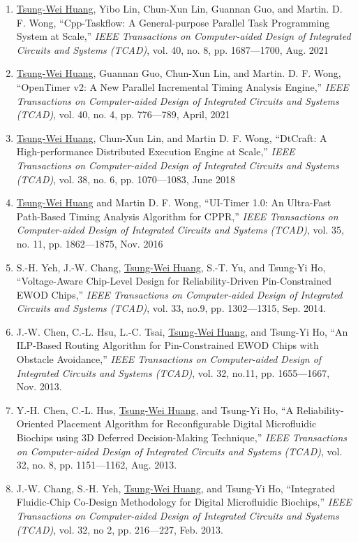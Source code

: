 \documentclass[A4,11pt]{article}
\begin{document}
\begin{enumerate}
  \item \underline{Tsung-Wei Huang}, Yibo Lin, Chun-Xun Lin, Guannan Guo, and Martin. D. F. Wong, ``Cpp-Taskflow: A General-purpose Parallel Task Programming System at Scale,'' \textit{IEEE Transactions on Computer-aided Design of Integrated Circuits and Systems (TCAD)}, vol. 40, no. 8, pp. 1687—1700, Aug. 2021
  \item \underline{Tsung-Wei Huang}, Guannan Guo, Chun-Xun Lin, and Martin. D. F. Wong, ``OpenTimer v2: A New Parallel Incremental Timing Analysis Engine,'' \textit{IEEE Transactions on Computer-aided Design of Integrated Circuits and Systems (TCAD)}, vol. 40, no. 4, pp. 776—789, April, 2021
  \item \underline{Tsung-Wei Huang}, Chun-Xun Lin, and Martin D. F. Wong, ``DtCraft: A High-performance Distributed Execution Engine at Scale,'' \textit{IEEE Transactions on Computer-aided Design of Integrated Circuits and Systems (TCAD)}, vol. 38, no. 6, pp. 1070—1083, June 2018
  \item \underline{Tsung-Wei Huang} and Martin D. F. Wong, ``UI-Timer 1.0: An Ultra-Fast Path-Based Timing Analysis Algorithm for CPPR,'' \textit{IEEE Transactions on Computer-aided Design of Integrated Circuits and Systems (TCAD)}, vol. 35, no. 11, pp. 1862—1875, Nov. 2016
  \item S.-H. Yeh, J.-W. Chang, \underline{Tsung-Wei Huang}, S.-T. Yu, and Tsung-Yi Ho, ``Voltage-Aware Chip-Level Design for Reliability-Driven Pin-Constrained EWOD Chips,'' \textit{IEEE Transactions on Computer-aided Design of Integrated Circuits and Systems (TCAD)}, vol. 33, no.9, pp. 1302—1315, Sep. 2014. 
  \item J.-W. Chen, C.-L. Hsu, L.-C. Tsai, \underline{Tsung-Wei Huang}, and Tsung-Yi Ho, ``An ILP-Based Routing Algorithm for Pin-Constrained EWOD Chips with Obstacle Avoidance,'' \textit{IEEE Transactions on Computer-aided Design of Integrated Circuits and Systems (TCAD)}, vol. 32, no.11, pp. 1655—1667, Nov. 2013.
  \item Y.-H. Chen, C.-L. Hus, \underline{Tsung-Wei Huang}, and Tsung-Yi Ho, ``A Reliability-Oriented Placement Algorithm for Reconfigurable Digital Microfluidic Biochips using 3D Deferred Decision-Making Technique,'' \textit{IEEE Transactions on Computer-aided Design of Integrated Circuits and Systems (TCAD)}, vol. 32, no. 8, pp. 1151—1162, Aug. 2013.
  \item J.-W. Chang, S.-H. Yeh, \underline{Tsung-Wei Huang}, and Tsung-Yi Ho, ``Integrated Fluidic-Chip Co-Design Methodology for Digital Microfluidic Biochips,'' \textit{IEEE Transactions on Computer-aided Design of Integrated Circuits and Systems (TCAD)}, vol. 32, no 2, pp. 216—227, Feb. 2013.

\end{enumerate}
\end{document}
